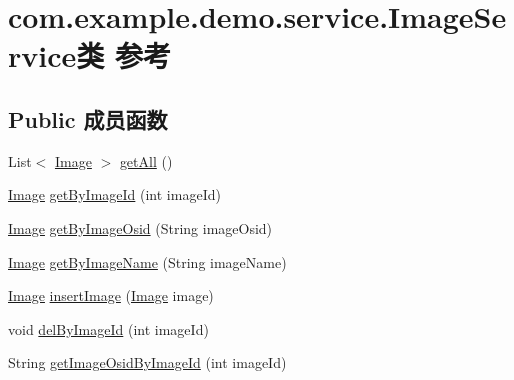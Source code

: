 \hypertarget{classcom_1_1example_1_1demo_1_1service_1_1_image_service}{}\section{com.\+example.\+demo.\+service.\+Image\+Service类 参考}
\label{classcom_1_1example_1_1demo_1_1service_1_1_image_service}
\subsection*{Public 成员函数}
\begin{DoxyCompactItemize}
\item 
List$<$ \mbox{\hyperlink{classcom_1_1example_1_1demo_1_1modular_1_1_image}{Image}} $>$ \mbox{\hyperlink{classcom_1_1example_1_1demo_1_1service_1_1_image_service_a2d4f9d32c0fb6f92bf170a9033e6b158}{get\+All}} ()
\item 
\mbox{\hyperlink{classcom_1_1example_1_1demo_1_1modular_1_1_image}{Image}} \mbox{\hyperlink{classcom_1_1example_1_1demo_1_1service_1_1_image_service_a9b4bba6a53e43d2e264893e322bffa64}{get\+By\+Image\+Id}} (int image\+Id)
\item 
\mbox{\hyperlink{classcom_1_1example_1_1demo_1_1modular_1_1_image}{Image}} \mbox{\hyperlink{classcom_1_1example_1_1demo_1_1service_1_1_image_service_ab2d7f1a77ea5301b5efd40a908844652}{get\+By\+Image\+Osid}} (String image\+Osid)
\item 
\mbox{\hyperlink{classcom_1_1example_1_1demo_1_1modular_1_1_image}{Image}} \mbox{\hyperlink{classcom_1_1example_1_1demo_1_1service_1_1_image_service_a89a3d1db5005677b5236281ce668ea5d}{get\+By\+Image\+Name}} (String image\+Name)
\item 
\mbox{\hyperlink{classcom_1_1example_1_1demo_1_1modular_1_1_image}{Image}} \mbox{\hyperlink{classcom_1_1example_1_1demo_1_1service_1_1_image_service_a88f1028f8857480580b715e9ac13c44b}{insert\+Image}} (\mbox{\hyperlink{classcom_1_1example_1_1demo_1_1modular_1_1_image}{Image}} image)
\item 
void \mbox{\hyperlink{classcom_1_1example_1_1demo_1_1service_1_1_image_service_a6fd7bafa20fb24c5caa2f3377d1d2971}{del\+By\+Image\+Id}} (int image\+Id)
\item 
String \mbox{\hyperlink{classcom_1_1example_1_1demo_1_1service_1_1_image_service_a062f661bd497c054633774c2a3d0928a}{get\+Image\+Osid\+By\+Image\+Id}} (int image\+Id)
\end{DoxyCompactItemize}
